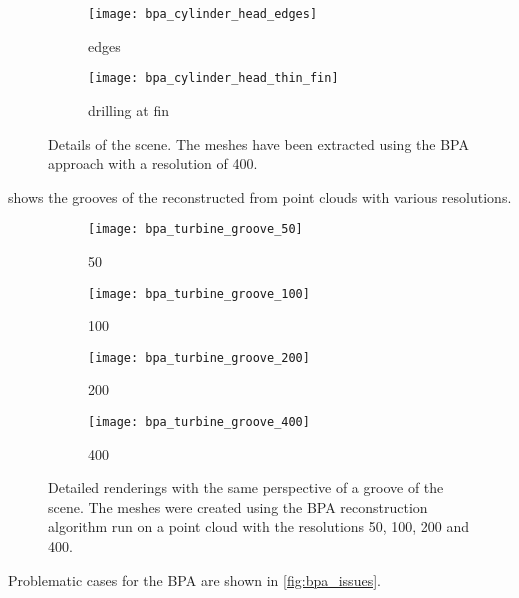 \begin{figure}
	\centering
	\begin{subfigure}[b]{0.49\textwidth}
		\centering
		\texttt{[image: bpa\_cylinder\_head\_edges]}
		\caption{\cylinderhead edges}
		\label{fig:bpa_cylinder_head_edges}
	\end{subfigure}
	\begin{subfigure}[b]{0.49\textwidth}
		\centering
		\texttt{[image: bpa\_cylinder\_head\_thin\_fin]}
		\caption{\cylinderhead drilling at fin}
		\label{fig:bpa_cylinder_head_thin_fin}
	\end{subfigure}
	\caption[BPA result details]{
		Details of the \cylinderhead scene.
		The meshes have been extracted using the BPA approach with a resolution of 400.
	}
	\label{fig:bpa_cylinder_head_details}
\end{figure}

 shows the grooves of the \turbine reconstructed from point clouds with various resolutions.

\begin{figure}
	\centering
	\begin{subfigure}[b]{0.24\textwidth}
		\centering
		\texttt{[image: bpa\_turbine\_groove\_50]}
		\caption{50}
		\label{fig:bpa_turbine_groove_50}
	\end{subfigure}
	\begin{subfigure}[b]{0.24\textwidth}
		\centering
		\texttt{[image: bpa\_turbine\_groove\_100]}
		\caption{100}
		\label{fig:bpa_turbine_groove_100}
	\end{subfigure}
	\begin{subfigure}[b]{0.24\textwidth}
		\centering
		\texttt{[image: bpa\_turbine\_groove\_200]}
		\caption{200}
		\label{fig:bpa_turbine_groove_200}
	\end{subfigure}
	\begin{subfigure}[b]{0.24\textwidth}
		\centering
		\texttt{[image: bpa\_turbine\_groove\_400]}
		\caption{400}
		\label{fig:bpa_turbine_groove_400}
	\end{subfigure}
	\caption[BPA \turbine grooves]{
		Detailed renderings with the same perspective of a groove of the \turbine scene.
		The meshes were created using the BPA reconstruction algorithm run on a point cloud with the resolutions 50, 100, 200 and 400.
	}
	\label{fig:bpa_grooves}
\end{figure}

Problematic cases for the BPA are shown in \cref{fig:bpa_issues}.


